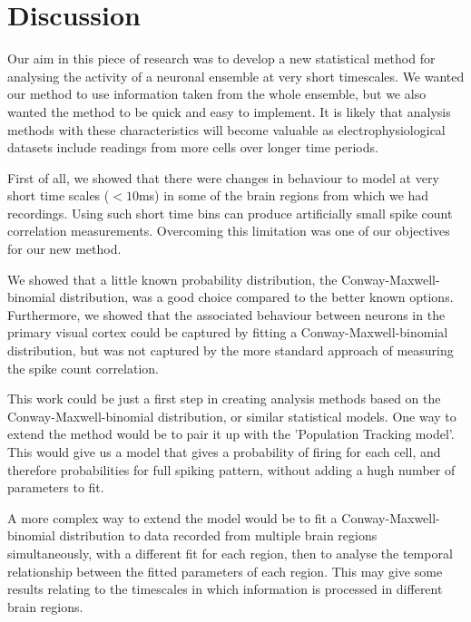 \documentclass[a4paper,12pt]{article}
\theoremstyle{definition}
\begin{document}
\section{Discussion}
Our aim in this piece of research was to develop a new statistical method for analysing the activity of a neuronal ensemble at very short timescales. We wanted our method to use information taken from the whole ensemble, but we also wanted the method to be quick and easy to implement. It is likely that analysis methods with these characteristics will become valuable as electrophysiological datasets include readings from more cells over longer time periods.

First of all, we showed that there were changes in behaviour to model at very short time scales ($<10$ms) in some of the brain regions from which we had recordings. Using such short time bins can produce artificially small spike count correlation measurements\cite{cohen}. Overcoming this limitation was one of our objectives for our new method.

We showed that a little known probability distribution, the Conway-Maxwell-binomial distribution, was a good choice compared to the better known options. Furthermore, we showed that the associated behaviour between neurons in the primary visual cortex could be captured by fitting a Conway-Maxwell-binomial distribution, but was not captured by the more standard approach of measuring the spike count correlation.

This work could be just a first step in creating analysis methods based on the Conway-Maxwell-binomial distribution, or similar statistical models. One way to extend the method would be to pair it up with the 'Population Tracking model'\cite{odonnell}. This would give us a model that gives a probability of firing for each cell, and therefore probabilities for full spiking pattern, without adding a hugh number of parameters to fit.

A more complex way to extend the model would be to fit a Conway-Maxwell-binomial distribution to data recorded from multiple brain regions simultaneously, with a different fit for each region, then to analyse the temporal relationship between the fitted parameters of each region. This may give some results relating to the timescales in which information is processed in different brain regions.


\end{document}
